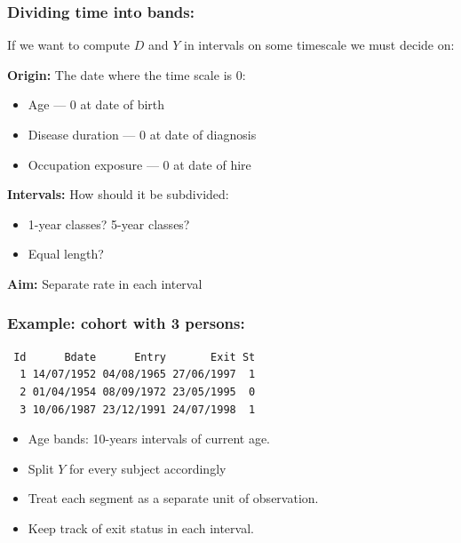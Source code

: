 \begin{frame}
  \frametitle{Dividing time into bands:} 

  If we want to compute $D$ and $Y$ in intervals on some timescale we
  must decide on:

\pause
\textbf{Origin:} The date where the time scale is $0$: \pause
  \begin{itemize}
  \item Age --- $0$ at date of birth
  \item Disease duration --- $0$ at date of diagnosis
  \item Occupation exposure --- $0$ at date of hire
  \end{itemize}

\pause
\textbf{Intervals:} How should it be subdivided:
 \begin{itemize}
  \item 1-year classes? 5-year classes?
  \item Equal length?
  \end{itemize}

\pause
\textbf{Aim:} Separate rate in each interval

\end{frame}

\begin{frame}[fragile]
  \frametitle{Example: cohort with 3 persons:}
\small
\renewcommand{\baselinestretch}{0.9}
\begin{verbatim}
 Id      Bdate      Entry       Exit St
  1 14/07/1952 04/08/1965 27/06/1997  1
  2 01/04/1954 08/09/1972 23/05/1995  0
  3 10/06/1987 23/12/1991 24/07/1998  1
\end{verbatim}
\renewcommand{\baselinestretch}{1.0}
\normalsize
\pause
\vspace*{-1ex}
\begin{itemize}[<+->]
\item Age bands: 10-years intervals of current age.
\item Split $Y$ for every subject accordingly
\item Treat each segment as a separate unit of observation.
\item Keep track of exit status in each interval.
\end{itemize}

\end{frame}

